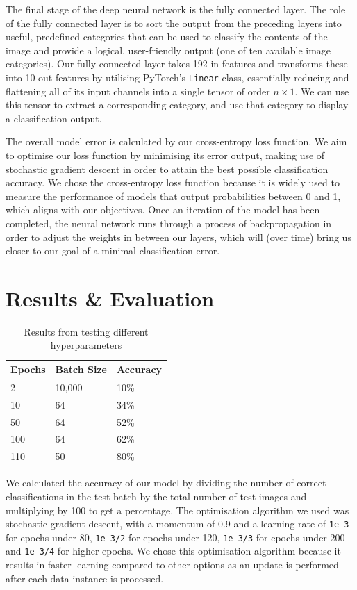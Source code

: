 \documentclass[journal,twoside]{IEEEtran}
\begin{document}
The final stage of the deep neural network is the fully connected layer. The role of the fully connected layer is to sort the output from the preceding layers into useful, predefined categories that can be used to classify the contents of the image and provide a logical, user-friendly output (one of ten available image categories). Our fully connected layer takes 192 in-features and transforms these into 10 out-features by utilising PyTorch's \texttt{Linear} class, essentially reducing and flattening all of its input channels into a single tensor of order $n\times{}1$. We can use this tensor to extract a corresponding category, and use that category to display a classification output.

The overall model error is calculated by our cross-entropy loss function. We aim to optimise our loss function by minimising its error output, making use of stochastic gradient descent in order to attain the best possible classification accuracy. We chose the cross-entropy loss function because it is widely used to measure the performance of models that output probabilities between 0 and 1, which aligns with our objectives. Once an iteration of the model has been completed, the neural network runs through a process of backpropagation in order to adjust the weights in between our layers, which will (over time) bring us closer to our goal of a minimal classification error.

\newpage

\section{Results \& Evaluation}

\begin{table}[h!]
\label{table:results}
\caption{Results from testing different hyperparameters}

\begin{tabularx}{\columnwidth}{llX}
\hline
Epochs & Batch Size & Accuracy\\
\hline
2 & 10,000 & 10\% \\
10 & 64 & 34\% \\
50 & 64 & 52\% \\
100 & 64 & 62\% \\
110 & 50 & 80\% \\
\hline
\end{tabularx}
\end{table}

We calculated the accuracy of our model by dividing the number of correct classifications in the test batch by the total number of test images and multiplying by 100 to get a percentage. The optimisation algorithm we used was stochastic gradient descent, with a momentum of 0.9 and a learning rate of \texttt{1e-3} for epochs under 80, \texttt{1e-3/2} for epochs under 120, \texttt{1e-3/3} for epochs under 200 and \texttt{1e-3/4} for higher epochs. We chose this optimisation algorithm because it results in faster learning compared to other options as an update is performed after each data instance is processed.
\end{document}
